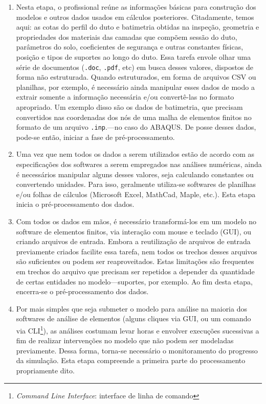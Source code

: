 \begin{enumerate}[label= (\arabic*)]
    \item Nesta etapa, o profissional reúne as informações básicas para construção dos modelos e outros dados usados em cálculos posteriores. Citadamente, temos aqui: as cotas do perfil do duto e batimetria obtidas na inspeção, geometria e propriedades dos materiais das camadas que compõem sessão do duto, parâmetros do solo, coeficientes de segurança e outras constantes físicas, posição e tipos de suportes ao longo do duto. Essa tarefa envole olhar uma série de documentos (\texttt{.doc}, \texttt{.pdf}, etc) em busca desses valores, dispostos de forma não estruturada. Quando estruturados, em forma de arquivos CSV ou planilhas, por exemplo, é necessário ainda manipular esses dados de modo a extrair somente a informação necessária e/ou convertê-las no formato apropriado. Um exemplo disso são os dados de batimetria, que precisam convertidos nas coordenadas dos nós de uma malha de elementos finitos no formato de um arquivo \texttt{.inp}.---no caso do ABAQUS. De posse desses dados, pode-se então, iniciar a fase de pré-processamento.
    \item Uma vez que nem todos os dados a serem utilizados estão de acordo com as especificações dos softwares a serem empregados nas análises numéricas, ainda é necessários manipular alguns desses valores, seja calculando constantes ou convertendo unidades. Para isso, geralmente utiliza-se softwares de planilhas e/ou folhas de cálculos (Microsoft Excel, MathCad, Maple, etc.). Esta etapa inicia o pré-processamento dos dados.
    \item Com todos os dados em mãos, é necessário transformá-los em um modelo no software de elementos finitos, via interação com mouse e teclado (GUI), ou criando arquivos de entrada. Embora a reutilização de arquivos de entrada previamente criados facilite essa tarefa, nem todos os trechos desses arquivos são suficientes ou podem ser reaproveitados. Estas limitações são frequentes em trechos do arquivo que precisam ser repetidos a depender da quantidade de certas entidades no modelo---suportes, por exemplo. Ao fim desta etapa, encerra-se o pré-processamento dos dados.
    \item Por mais simples que seja submeter o modelo para análise na maioria dos softwares de análise de elementos (alguns cliques via GUI, ou um comando via CLI\footnote{\textit{Command Line Interface}: interface de linha de comando}), as análises costumam levar horas e envolver execuções sucessivas a fim de realizar intervenções no modelo que não podem ser modeladas previamente. Dessa forma, torna-se necessário o monitoramento do progresso da simulação. Esta etapa compreende a primeira parte do processamento propriamente dito.

\end{enumerate}
